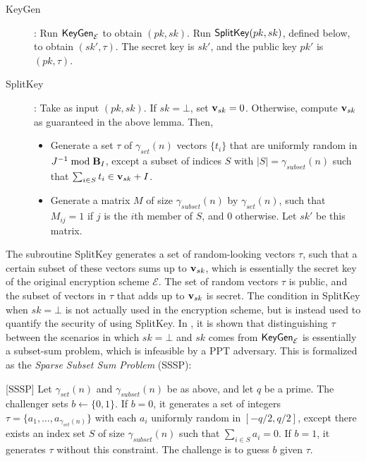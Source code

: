 \begin{description}
\item[KeyGen]: Run ${\sf KeyGen}_\mathcal{E}$ to obtain $(pk, sk)$. Run ${\sf SplitKey}(pk, sk)$, defined below, to obtain $(sk', \tau)$. The secret key is $sk'$, and the public key $pk'$ is $(pk, \tau)$.

\item[SplitKey]: Take as input $(pk, sk)$. If $sk = \bot$, set ${\bf v}_{sk} = 0$. Otherwise, compute ${\bf v}_{sk}$ as guaranteed in the above lemma. Then,
\begin{itemize}
\item Generate a set $\tau$ of $\gamma_{set}(n)$ vectors $\{t_i\}$ that are uniformly random in $J ^{-1} \bmod \textbf{B}_I$, except a subset of indices $S$ with $|S| = \gamma_{subset}(n)$ such that $\sum_{i \in S} t_i \in {\bf v}_{sk} + I$.
\item Generate a matrix $M$ of size $\gamma_{subset}(n)$ by $\gamma_{set}(n)$, such that $M_{ij} = 1$ if $j$ is the $i$th member of $S$, and $0$ otherwise. Let $sk'$ be this matrix.
\end{itemize}
\end{description}

The subroutine SplitKey generates a set of random-looking vectors $\tau$, such that a certain subset of these vectors sums up to ${\bf v}_{sk}$, which is essentially the secret key of the original encryption scheme $\mathcal{E}$. The set of random vectors $\tau$ is public, and the subset of vectors in $\tau$ that adds up to ${\bf v}_{sk}$ is secret. The condition in SplitKey when $sk = \bot$ is not actually used in the encryption scheme, but is instead used to quantify the security of using SplitKey. In \cite{gentry2009fully}, it is shown that distinguishing $\tau$ between the scenarios in which $sk = \bot$ and $sk$ comes from ${\sf KeyGen}_\mathcal{E}$ is essentially a subset-sum problem, which is infeasible by a PPT adversary. This is formalized as the \emph{Sparse Subset Sum Problem} (SSSP):
\begin{definition} \label{def: sssp} [SSSP]
    Let $\gamma_{set}(n)$ and $\gamma_{subset}(n)$ be as above, and let $q$ be a prime. The challenger sets $b \leftarrow \{0,1\}$. If $b = 0$, it generates a set of integers $\tau = \{a_1, \dots, a_{\gamma_{set}(n)}\}$ with each $a_i$ uniformly random in $[-q/2, q/2]$, except there exists an index set $S$ of size $\gamma_{subset}(n)$ such that $\sum_{i \in S} a_i = 0$. If $b = 1$, it generates $\tau$ without this constraint. The challenge is to guess $b$ given $\tau$.
\end{definition}

